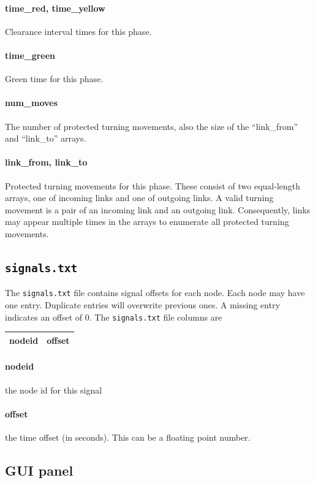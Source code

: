 \paragraph*{time\_red, time\_yellow} Clearance interval times for this phase.
\paragraph*{time\_green} Green time for this phase.
\paragraph*{num\_moves} The number of protected turning movements, also the size of the ``link\_from'' and ``link\_to'' arrays.
\paragraph*{link\_from, link\_to} Protected turning movements for this phase. These consist of two equal-length arrays, one of incoming links and one of outgoing links. A valid turning movement is a pair of an incoming link and an outgoing link. Consequently, links may appear multiple times in the arrays to enumerate all protected turning movements.

\subsection{\texttt{signals.txt}}
The \texttt{signals.txt} file contains signal offsets for each node. Each node may have one entry. Duplicate entries will overwrite previous ones. A missing entry indicates an offset of $0$. The \texttt{signals.txt} file columns are
\begin{center}
\begin{tabular}{cc}
\hline
nodeid & offset\\\hline
\end{tabular}
\end{center}
\paragraph*{nodeid} the node id for this signal
\paragraph*{offset} the time offset (in seconds). This can be a floating point number.


\subsection{GUI panel}

